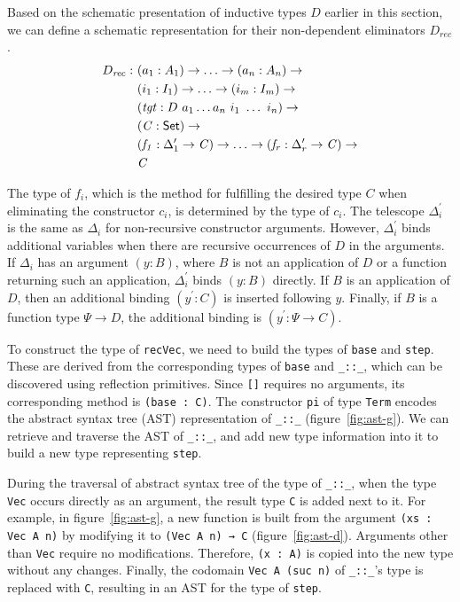\documentclass[sigplan,10pt]{acmart}
\begin{document}
Based on the schematic presentation of inductive types $D$ earlier in this section, we can define a schematic representation for their non-dependent eliminators $D_{\mathit{rec}}$.
\begin{align*}
D_{\mathit{rec}} :\ & (a_1 : A_1) \to \ldots \to (a_n : A_n) \to\\
& (i_1 : I_1) \to \ldots \to (i_m : I_m) \to\\
& (\mathit{tgt} : D\ a_1 \ldots a_n\ i_1\ \ldots\ i_n) \to\\
& (\mathit{C} : \textsf{Set}{}) \to \\
& (\mathit{f_1} : \Delta_1^\prime \to \mathit{C}) \to \ldots \to (\mathit{f_r} : \Delta_r^\prime \to \mathit{C}) \to \\
& \mathit{C}
\end{align*}

The type of $f_i$, which is the method for fulfilling the desired type $C$ when eliminating the constructor $c_i$, is determined by the type of $c_i$.
The telescope $\Delta_i^\prime$ is the same as $\Delta_i$ for non-recursive constructor arguments.
However, $\Delta_i^\prime$ binds additional variables when there are recursive occurrences of $D$ in the arguments.
If $\Delta_i$ has an argument $(y : B)$, where $B$ is not an application of $D$ or a function returning such an application, $\Delta_i^\prime$ binds $(y : B)$ directly.
If $B$ is an application of $D$, then an additional binding $(y^\prime : C)$ is inserted following $y$.
Finally, if $B$ is a function type $\Psi \to D$, the additional binding is $(y^\prime : \Psi \to C)$. 

To construct the type of \texttt{recVec}, we need to build the types of {\tt base} and {\tt step}.
These are derived from the corresponding types of \texttt{base} and \texttt{\_::\_}, which can be discovered using reflection primitives.
Since {\tt []} requires no arguments, its corresponding method is {\tt (base : C)}.
The constructor {\tt pi} of type {\tt Term} encodes the abstract syntax tree (AST) representation of {\tt \_::\_} (figure~\ref{fig:ast-g}). We can retrieve and traverse the AST of {\tt \_::\_}, and add new type information into it to build a new type representing {\tt step}.

During the traversal of abstract syntax tree of the type of {\tt \_::\_}, when the type {\tt Vec} occurs directly as an argument, the result type {\tt C} is added next to it.
For example, in figure~\ref{fig:ast-g}, a new function is built from the argument {\tt (xs : Vec A n)} by modifying it to {\tt (Vec A n) → C} (figure~\ref{fig:ast-d}).
Arguments other than \texttt{Vec} require no modifications.
Therefore, {\tt (x : A)} is copied into the new type without any changes.
Finally, the codomain \texttt{Vec A (suc n)} of {\tt \_::\_}'s type is replaced with \texttt{C}, resulting in an AST for the type of {\tt step}.
\end{document}
